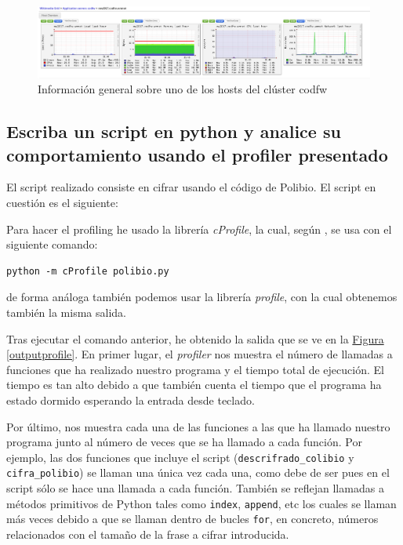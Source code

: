 \documentclass[10pt,a4paper,spanish]{article}
\numberwithin{equation}{section} %
\numberwithin{figure}{section} %
\numberwithin{table}{section} %
\begin{document}
\begin{figure}[!h]
    \centering
    \includegraphics[width=1\textwidth]{52}
    \caption{Información general sobre uno de los hosts del clúster codfw}
    \label{codfwhost}
\end{figure}

\setcounter{subsection}{8}
\subsection{Escriba un script en python y analice su comportamiento usando el profiler presentado}
El script realizado consiste en cifrar usando el código de Polibio\cite{polibio}. El script en cuestión es el siguiente:


Para hacer el profiling he usado la librería \textit{cProfile}, la cual, según \cite{pyprofile}, se usa con el siguiente comando:

\begin{verbatim}
python -m cProfile polibio.py
\end{verbatim}

de forma análoga también podemos usar la librería \textit{profile}, con la cual obtenemos también la misma salida.

Tras ejecutar el comando anterior, he obtenido la salida que se ve en la \hyperref[outputprofile]{Figura \ref*{outputprofile}}. En primer lugar, el \textit{profiler} nos muestra el número de llamadas a funciones que ha realizado nuestro programa y el tiempo total de ejecución. El tiempo es tan alto debido a que también cuenta el tiempo que el programa ha estado dormido esperando la entrada desde teclado.

Por último, nos muestra cada una de las funciones a las que ha llamado nuestro programa junto al número de veces que se ha llamado a cada función. Por ejemplo, las dos funciones que incluye el script (\texttt{descrifrado\_colibio} y \texttt{cifra\_polibio}) se llaman una única vez cada una, como debe de ser pues en el script sólo se hace una llamada a cada función. También se reflejan llamadas a métodos primitivos de Python tales como \texttt{index}, \texttt{append}, etc los cuales se llaman más veces debido a que se llaman dentro de bucles \texttt{for}, en concreto, números relacionados con el tamaño de la frase a cifrar introducida.
\end{document}
